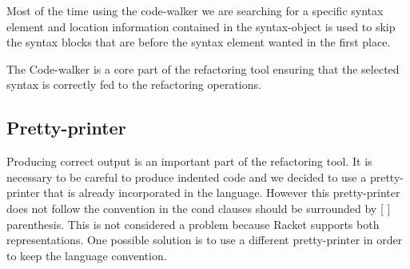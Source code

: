 
Most of the time using the code-walker we are searching for a specific syntax element
and location information contained in the syntax-object  is used to skip the syntax
 blocks that are before the syntax element wanted in the first place.

The Code-walker is a core part of the refactoring tool ensuring that the selected
syntax is correctly fed to the refactoring operations. %



\subsection{Pretty-printer} %
Producing correct output is an important part of the refactoring tool.
It is necessary to be careful to produce indented code and we decided to use a pretty-printer
that is already incorporated in the language.
However this pretty-printer does not follow the convention in the cond clauses
should be surrounded by [ ] parenthesis. This is not considered a problem because
Racket supports both representations.
One possible solution is to use a different pretty-printer in
order to keep the language convention.


